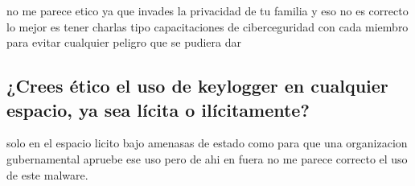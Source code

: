 no me parece etico ya que invades la privacidad de tu familia y eso no es correcto lo mejor es tener charlas tipo capacitaciones de ciberceguridad con cada miembro para evitar cualquier peligro que se pudiera dar

\subsection{¿Crees ético el uso de keylogger en cualquier espacio, ya sea lícita o ilícitamente?}

solo en el espacio licito bajo amenasas de estado como para que una organizacion gubernamental apruebe ese uso pero de ahi en fuera no me parece correcto el uso de este malware.




